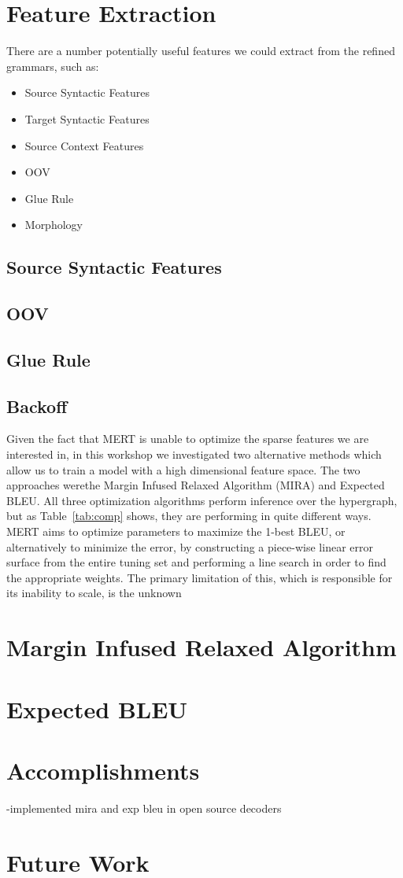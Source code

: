 \section{Feature Extraction}
There are a number potentially useful features we could extract from the refined grammars, such as:
\begin{itemize}
\item Source Syntactic Features
\item Target Syntactic Features
\item Source Context Features
\item OOV
\item Glue Rule
\item Morphology
\end{itemize}


\subsection{Source Syntactic Features}
\subsection{OOV}
\subsection{Glue Rule}
\subsection{Backoff}

Given the fact that MERT is unable to optimize the sparse features we are interested in, in this workshop we investigated two alternative methods which allow us to train a model with a high dimensional feature space. The two approaches werethe Margin Infused Relaxed Algorithm (MIRA) and Expected BLEU. All three optimization algorithms perform inference over the hypergraph, but as Table~\ref{tab:comp} shows, they are performing in quite different ways. MERT aims to optimize parameters to maximize the 1-best BLEU, or alternatively to minimize the error, by constructing a piece-wise linear error surface from the entire tuning set and performing a line search in order to find the appropriate weights. The primary limitation of this, which is responsible for its inability to scale, is the unknown

\section{Margin Infused Relaxed Algorithm}
\section{Expected BLEU}
\section{Accomplishments}
-implemented mira and exp bleu in open source decoders

\section{Future Work}
